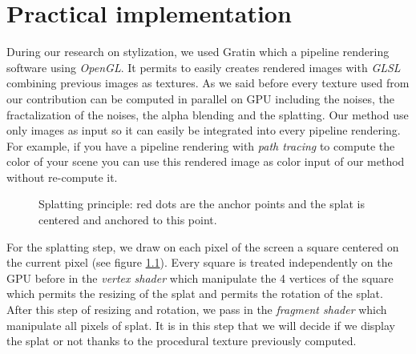 \chapter{Practical implementation}




During our research on stylization, we used Gratin \cite{vergne:hal-01254546} which a pipeline rendering software using \textit{OpenGL}. It permits to easily creates rendered images with \textit{GLSL} combining previous images as textures. As we said before every texture used from our contribution can be computed in parallel on GPU including the noises, the fractalization of the noises, the alpha blending and the splatting. Our method use only images as input so it can easily be integrated into every pipeline rendering. For example, if you have a pipeline rendering with \textit{path tracing} to compute the color of your scene you can use this rendered image as color input of our method without re-compute it.\newline

\begin{figure}[H]
    \begin{center}
    \end{center}
    \caption{Splatting principle: red dots are the anchor points and the splat is centered and anchored to this point.}
    \label{splatting_principle}
\end{figure}

For the splatting step, we draw on each pixel of the screen a square centered on the current pixel (see figure \ref{splatting_principle}). Every square is treated independently on the GPU before in the \textit{vertex shader} which manipulate the 4 vertices of the square which permits the resizing of the splat and permits the rotation of the splat. After this step of resizing and rotation, we pass in the \textit{fragment shader} which manipulate all pixels of splat. It is in this step that we will decide if we display the splat or not thanks to the procedural texture previously computed. \newline

